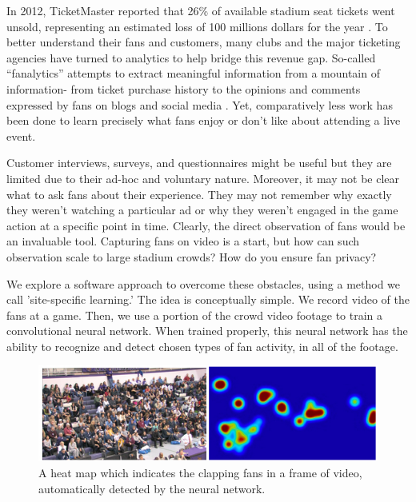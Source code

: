 \documentclass[times, 10pt,twocolumn]{article}
\begin{document}

In 2012, TicketMaster reported that 26\% of available stadium seat tickets went unsold, representing an estimated loss of 100 millions dollars for the year \cite{ticketmaster}.  To better understand their fans and customers, many clubs and the major ticketing agencies have turned to analytics to help bridge this revenue gap.  So-called ``fanalytics'' attempts to extract meaningful information from a mountain of information- from ticket purchase history to the opinions and comments expressed by fans on blogs and social media  \cite{fanalytics}.  Yet, comparatively less work has been done to learn precisely what fans enjoy or don't like about attending a live event.   

Customer interviews, surveys, and questionnaires might be useful but they are limited due to their ad-hoc and voluntary nature.  Moreover, it may not be clear what to ask fans about their experience.  They may not remember why exactly they weren't watching a particular ad or why they weren't engaged in the game action at a specific point in time.  Clearly, the direct observation of fans would be an invaluable tool.  Capturing fans on video is a start, but how can such observation scale to large stadium crowds?  How do you ensure fan privacy?     

We explore a software approach to overcome these obstacles, using a method we call 'site-specific learning.'  The idea is conceptually simple.  We record video of the fans at a game.  Then, we use a portion of the crowd video footage to train a convolutional neural network.  When trained properly, this neural network has the ability to recognize and detect chosen types of fan activity, in all of the footage.  

\begin{figure}[bt]
\centering
\includegraphics[width=0.96\columnwidth]{fanheat}
\caption{\label{fig_fanheat} \small A heat map which indicates the clapping fans in a frame of video, automatically detected by the neural network. }
\end{figure}
\end{document}
